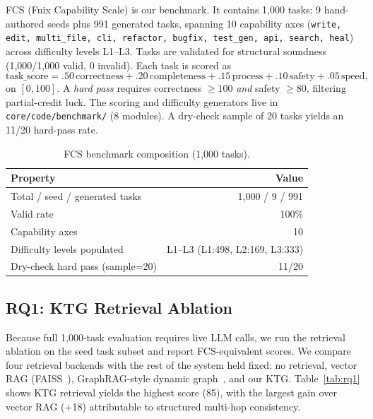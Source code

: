 \documentclass[sigconf]{acmart}
\begin{document}
FCS (Fnix Capability Scale) is our benchmark. It contains 1{,}000 tasks: 9 hand-authored seeds plus 991 generated tasks, spanning 10 capability axes (\texttt{write, edit, multi\_file, cli, refactor, bugfix, test\_gen, api, search, heal}) across difficulty levels L1--L3. Tasks are validated for structural soundness (1{,}000/1{,}000 valid, 0 invalid). Each task is scored as
\begin{equation}
  \text{task\_score} = .50\,\text{correctness} + .20\,\text{completeness} + .15\,\text{process} + .10\,\text{safety} + .05\,\text{speed},
  \label{eq:fcs}
\end{equation}
on $[0,100]$. A \emph{hard pass} requires correctness $\geq 100$ \emph{and} safety $\geq 80$, filtering partial-credit luck. The scoring and difficulty generators live in \texttt{core/code/benchmark/} (8 modules). A dry-check sample of 20 tasks yields an 11/20 hard-pass rate.

\begin{table}[t]
  \small
  \caption{FCS benchmark composition (1{,}000 tasks).}
  \label{tab:fcs}
  \begin{tabular}{lr}
    \toprule
    Property & Value \\
    \midrule
    Total / seed / generated tasks & 1{,}000 / 9 / 991 \\
    Valid rate & 100\% \\
    Capability axes & 10 \\
    Difficulty levels populated & L1--L3 (L1:498, L2:169, L3:333) \\
    Dry-check hard pass (sample=20) & 11/20 \\
    \bottomrule
  \end{tabular}
\end{table}

\subsection{RQ1: KTG Retrieval Ablation}\label{sec:rq1}

Because full 1{,}000-task evaluation requires live LLM calls, we run the retrieval ablation on the seed task subset and report FCS-equivalent scores. We compare four retrieval backends with the rest of the system held fixed: no retrieval, vector RAG (FAISS~\cite{johnson2019faiss}), GraphRAG-style dynamic graph~\cite{edge2024graphrag}, and our KTG. Table~\ref{tab:rq1} shows KTG retrieval yields the highest score (85), with the largest gain over vector RAG (+18) attributable to structured multi-hop consistency.
\end{document}
